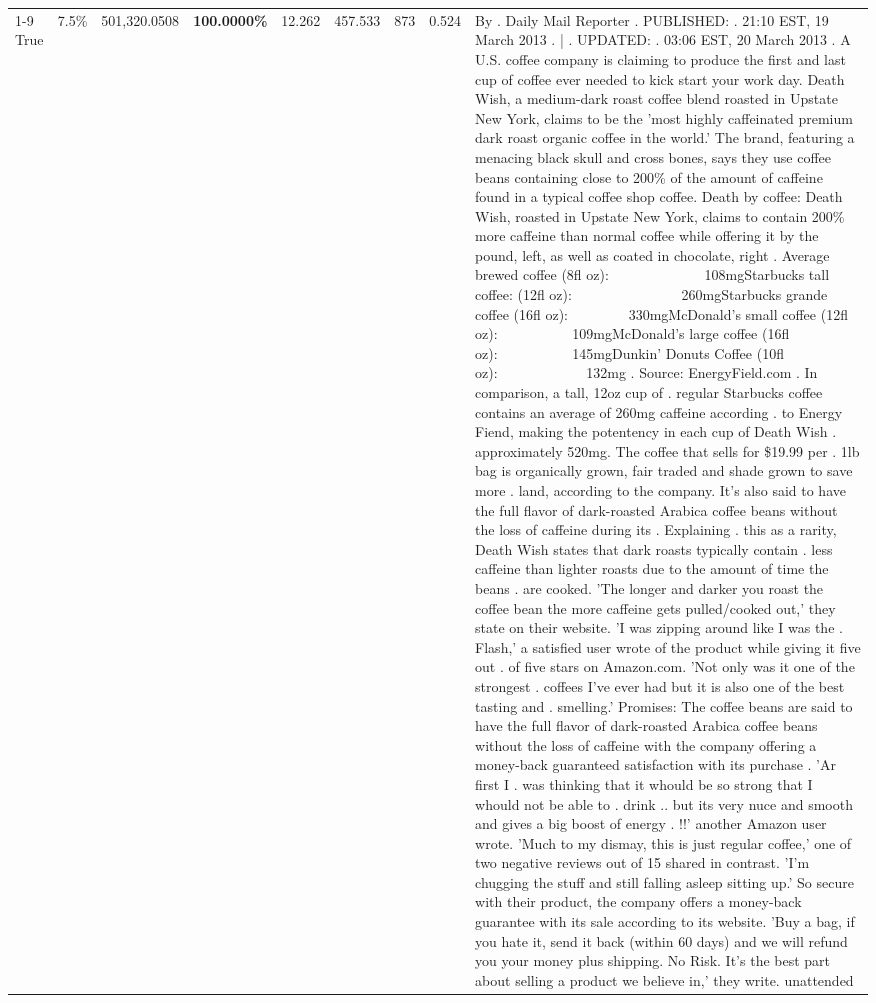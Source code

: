 \begin{table}[H]
{\begin{tabular}{lllrlllll}
\cline{1-9}
True & 7.5\% & 501,320.0508 & \bfseries \color{red} 100.0000\% & 12.262 & 457.533 & 873 & 0.524 & By . Daily Mail Reporter . PUBLISHED: . 21:10 EST, 19 March 2013 . | . UPDATED: . 03:06 EST, 20 March 2013 . A U.S. coffee company is claiming to produce the first and last cup of coffee ever needed to kick start your work day. Death Wish, a medium-dark roast coffee blend roasted in Upstate New York, claims to be the 'most highly caffeinated premium dark roast organic coffee in the world.' The brand, featuring a menacing black skull and cross bones, says they use coffee beans containing close to 200\% of the amount of caffeine found in a typical coffee shop coffee. Death by coffee: Death Wish, roasted in Upstate New York, claims to contain 200\% more caffeine than normal coffee while offering it by the pound, left, as well as coated in chocolate, right . Average brewed coffee (8fl oz):              108mgStarbucks tall coffee: (12fl oz):                260mgStarbucks grande coffee (16fl oz):         330mgMcDonald's small coffee (12fl oz):           109mgMcDonald's large coffee (16fl oz):           145mgDunkin' Donuts Coffee (10fl oz):             132mg . Source: EnergyField.com . In comparison, a tall, 12oz cup of . regular Starbucks coffee contains an average of 260mg caffeine according . to Energy Fiend, making the potentency in each cup of Death Wish . approximately 520mg. The coffee that sells for \$19.99 per . 1lb bag is organically grown, fair traded and shade grown to save more . land, according to the company. It's also said to have the full flavor of dark-roasted Arabica coffee beans without the loss of caffeine during its . Explaining . this as a rarity, Death Wish states that dark roasts typically contain . less caffeine than lighter roasts due to the amount of time the beans . are cooked. 'The longer and darker you roast the coffee bean the more caffeine gets pulled/cooked out,' they state on their website. 'I was zipping around like I was the . Flash,' a satisfied user wrote of the product while giving it five out . of five stars on Amazon.com. 'Not only was it one of the strongest . coffees I've ever had but it is also one of the best tasting and . smelling.’ Promises: The coffee beans are said to have the full flavor of dark-roasted Arabica coffee beans without the loss of caffeine with the company offering a money-back guaranteed satisfaction with its purchase . 'Ar first I . was thinking that it whould be so strong that I whould not be able to . drink .. but its very nuce and smooth and gives a big boost of energy . !!' another Amazon user wrote. 'Much to my dismay, this is just regular coffee,' one of two negative reviews out of 15 shared in contrast. 'I'm chugging the stuff and still falling asleep sitting up.' So secure with their product, the company offers a money-back guarantee with its sale according to its website. 'Buy a bag, if you hate it, send it back (within 60 days) and we will refund you your money plus shipping. No Risk. It’s the best part about selling a product we believe in,' they write. unattended \\

\end{tabular}}
\end{table}
